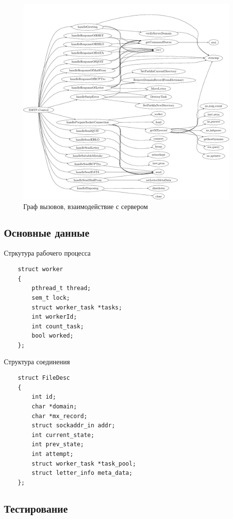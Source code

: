 \documentclass[a4paper,12pt]{report}
\begin{document}
\begin{figure}
    \centering
    \includegraphics[width=\textwidth]{include/ccflow02_dot.pdf}
    \caption{Граф вызовов, взаимодействие с сервером}
    \label{fig:ccflow02}
\end{figure}

\subsection{Основные данные}

Стркутура рабочего процесса
\begin{verbatim}
    struct worker
    {
        pthread_t thread;
        sem_t lock;
        struct worker_task *tasks;
        int workerId;
        int count_task;
        bool worked;
    };
\end{verbatim}

Структура соединения
\begin{verbatim}
    struct FileDesc
    {
        int id;
        char *domain;
        char *mx_record;
        struct sockaddr_in addr;
        int current_state;
        int prev_state;
        int attempt;
        struct worker_task *task_pool;
        struct letter_info meta_data;
    };
\end{verbatim} 

\subsection{Тестирование}
\end{document}
